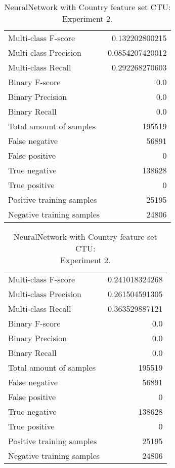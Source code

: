 \begin{table}[H]
\begin{minipage}{0.5\textwidth}
\caption{NeuralNetwork with Country feature set CTU: \\Experiment 1.}
\centering
\begin{tabular}{l r}
\toprule
Multi-class F-score & 0.132202800215 \\
Multi-class Precision & 0.0854207420012 \\
Multi-class Recall & 0.292268270603 \\
\midrule
Binary F-score & 0.0 \\
Binary Precision & 0.0 \\
Binary Recall & 0.0 \\
\midrule
Total amount of samples & 195519 \\
False negative & 56891 \\
False positive & 0 \\
True negative & 138628 \\
True positive & 0 \\
\midrule
Positive training samples & 25195 \\
Negative training samples & 24806 \\
\bottomrule
\end{tabular}
\end{minipage}
\hfillx
\begin{minipage}{0.5\textwidth}
\caption{NeuralNetwork with Country feature set CTU: \\Experiment 2.}
\centering
\begin{tabular}{l r}
\toprule
Multi-class F-score & 0.241018324268 \\
Multi-class Precision & 0.261504591305 \\
Multi-class Recall & 0.363529887121 \\
\midrule
Binary F-score & 0.0 \\
Binary Precision & 0.0 \\
Binary Recall & 0.0 \\
\midrule
Total amount of samples & 195519 \\
False negative & 56891 \\
False positive & 0 \\
True negative & 138628 \\
True positive & 0 \\
\midrule
Positive training samples & 25195 \\
Negative training samples & 24806 \\
\bottomrule
\end{tabular}
\end{minipage}
\end{table}
